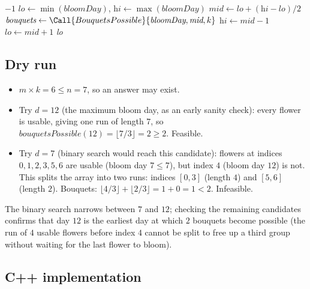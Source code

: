 \begin{algorithm}[H]
\caption{Minimum Day for M Bouquets}
\begin{algorithmic}[1]
   \Return $-1$ \EndIf
  \State $\textit{lo} \gets \min(\textit{bloomDay})$, $\textit{hi} \gets \max(\textit{bloomDay})$
    \State $\textit{mid} \gets \textit{lo}+(\textit{hi}-\textit{lo})/2$
    \State $\textit{bouquets} \gets \Call{BouquetsPossible}{\textit{bloomDay}, \textit{mid}, k}$
      \State $\textit{hi} \gets \textit{mid} - 1$
    \Else
      \State $\textit{lo} \gets \textit{mid} + 1$
    \EndIf
  \EndWhile
  \State \Return \textit{lo}
\EndProcedure
\end{algorithmic}
\end{algorithm}

\subsection*{Dry run}


\begin{itemize}
  \item $m \times k = 6 \le n = 7$, so an answer may exist.
  \item Try $d=12$ (the maximum bloom day, as an early sanity check): every
        flower is usable, giving one run of length $7$, so
        $\textit{bouquetsPossible}(12) = \lfloor 7/3 \rfloor = 2 \ge 2$.
        Feasible.
  \item Try $d=7$ (binary search would reach this candidate): flowers at
        indices $0,1,2,3,5,6$ are usable (bloom day $7 \le 7$), but index
        $4$ (bloom day $12$) is not. This splits the array into two runs:
        indices $[0,3]$ (length $4$) and $[5,6]$ (length $2$). Bouquets:
        $\lfloor 4/3 \rfloor + \lfloor 2/3 \rfloor = 1 + 0 = 1 < 2$.
        Infeasible.
\end{itemize}

The binary search narrows between $7$ and $12$; checking the remaining
candidates confirms that day $12$ is the earliest day at which $2$
bouquets become possible (the run of $4$ usable flowers before index $4$
cannot be split to free up a third group without waiting for the last
flower to bloom).

\subsection*{C++ implementation}

